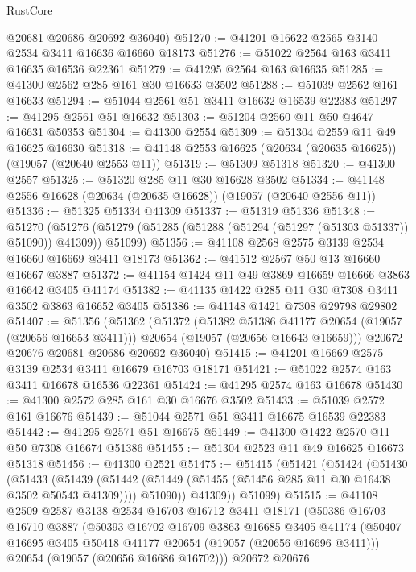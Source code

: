 \begin{lexlean}{RustCore}
\begin{coremodule}
      @20681
      @20686
      @20692
      @36040)
@51270 := @41201 @16622 @2565 @3140 @2534 @3411 @16636 @16660 @18173
@51276 := @51022 @2564 @163 @3411 @16635 @16536 @22361
@51279 := @41295 @2564 @163 @16635
@51285 := @41300 @2562 @285 @161 @30 @16633 @3502
@51288 := @51039 @2562 @161 @16633
@51294 := @51044 @2561 @51 @3411 @16632 @16539 @22383
@51297 := @41295 @2561 @51 @16632
@51303 := @51204 @2560 @11 @50 @4647 @16631 @50353
@51304 := @41300 @2554
@51309 := @51304 @2559 @11 @49 @16625 @16630
@51318 := @41148 @2553 @16625 (@20634 (@20635 @16625)) (@19057 (@20640 @2553 @11))
@51319 := @51309 @51318
@51320 := @41300 @2557
@51325 := @51320 @285 @11 @30 @16628 @3502
@51334 := @41148 @2556 @16628 (@20634 (@20635 @16628)) (@19057 (@20640 @2556 @11))
@51336 := @51325 @51334 @41309
@51337 := @51319 @51336
@51348 := @51270
    (@51276 (@51279 (@51285 (@51288 (@51294 (@51297 (@51303 @51337)) @51090)) @41309)) @51099)
@51356 := @41108 @2568 @2575 @3139 @2534 @16660 @16669 @3411 @18173
@51362 := @41512 @2567 @50 @13 @16660 @16667 @3887
@51372 := @41154 @1424 @11 @49 @3869 @16659 @16666 @3863 @16642 @3405 @41174
@51382 := @41135 @1422 @285 @11 @30 @7308 @3411 @3502 @3863 @16652 @3405
@51386 := @41148 @1421 @7308 @29798 @29802
@51407 := @51356
    (@51362
      (@51372
        (@51382 @51386 @41177 @20654 (@19057 (@20656 @16653 @3411)))
        @20654
        (@19057 (@20656 @16643 @16659)))
      @20672
      @20676
      @20681
      @20686
      @20692
      @36040)
@51415 := @41201 @16669 @2575 @3139 @2534 @3411 @16679 @16703 @18171
@51421 := @51022 @2574 @163 @3411 @16678 @16536 @22361
@51424 := @41295 @2574 @163 @16678
@51430 := @41300 @2572 @285 @161 @30 @16676 @3502
@51433 := @51039 @2572 @161 @16676
@51439 := @51044 @2571 @51 @3411 @16675 @16539 @22383
@51442 := @41295 @2571 @51 @16675
@51449 := @41300 @1422 @2570 @11 @50 @7308 @16674 @51386
@51455 := @51304 @2523 @11 @49 @16625 @16673 @51318
@51456 := @41300 @2521
@51475 := @51415
    (@51421
      (@51424
        (@51430
          (@51433
            (@51439
              (@51442 (@51449 (@51455 (@51456 @285 @11 @30 @16438 @3502 @50543 @41309))))
              @51090))
          @41309))
      @51099)
@51515 := @41108
    @2509
    @2587
    @3138
    @2534
    @16703
    @16712
    @3411
    @18171
    (@50386
      @16703
      @16710
      @3887
      (@50393
        @16702
        @16709
        @3863
        @16685
        @3405
        @41174
        (@50407 @16695 @3405 @50418 @41177 @20654 (@19057 (@20656 @16696 @3411)))
        @20654
        (@19057 (@20656 @16686 @16702)))
      @20672
      @20676

\end{coremodule}
\end{lexlean}
